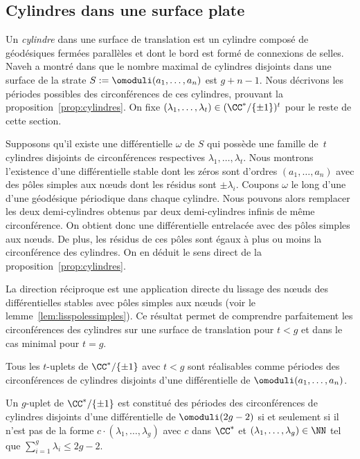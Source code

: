 \subsection{Cylindres dans une surface plate}
\label{sec:cylindres}
Un \emph{cylindre} dans une surface de translation est un cylindre composé de géodésiques fermées parallèles et dont le bord est formé de connexions de selles.
Naveh a montré dans \cite{Na} que le nombre maximal de cylindres disjoints dans une surface de la strate $S:=\omoduli(a_{1},\dots,a_{n})$ est $g+n-1$.
Nous décrivons les périodes possibles des circonférences de ces cylindres, prouvant la proposition~\ref{prop:cylindres}. On fixe $(\lambda_{1},\dots,\lambda_{t})\in (\CC^{\ast}/\{\pm1\})^{t}$ pour le reste de cette section.
\par
Supposons qu'il existe une différentielle $\omega$ de $S$ qui possède une famille de~$t$ cylindres disjoints de circonférences respectives $\lambda_{1},\dots,\lambda_{t}$. Nous montrons l'existence d'une différentielle stable dont les zéros sont d'ordres $(a_{1},\dots,a_{n})$ avec des pôles simples aux nœuds dont les résidus sont $\pm \lambda_{i}$. Coupons $\omega$ le long d'une d'une géodésique périodique dans chaque cylindre. Nous pouvons alors remplacer les deux demi-cylindres obtenus par deux demi-cylindres infinis de même circonférence. On obtient donc une différentielle entrelacée avec des pôles simples aux nœuds. De plus, les résidus de ces pôles sont égaux à plus ou moins la circonférence des cylindres. On en déduit le sens direct de la proposition~\ref{prop:cylindres}.
\par
La direction réciproque est une application directe du lissage des nœuds des différentielles stables avec pôles simples aux nœuds (voir le lemme~\ref{lem:lisspolessimples}).
Ce résultat permet de comprendre parfaitement les circonférences des cylindres sur une surface de translation pour $t <g$ et dans le cas minimal pour $t=g$.
\begin{cor}\label{cor:cylindres}
Tous les $t$-uplets de $\CC^{\ast}/\{\pm1\}$ avec $t < g$ sont réalisables comme périodes des circonférences de cylindres disjoints d'une différentielle de $\omoduli(a_{1},\dots,a_{n})$.

Un $g$-uplet de $\CC^{\ast}/\{\pm1\}$ est constitué des périodes des circonférences de cylindres disjoints d'une différentielle de $\omoduli(2g-2)$ si et seulement si il n'est pas de la forme $c \cdot (\lambda_{1},\dots, \lambda_{g})$ avec $c$ dans $\CC^{\ast}$ et $(\lambda_{1},\dots,\lambda_{g})\in \NN$ tel que $\sum_{i=1}^{g} \lambda_{i} \leq 2g-2$.
\end{cor}

